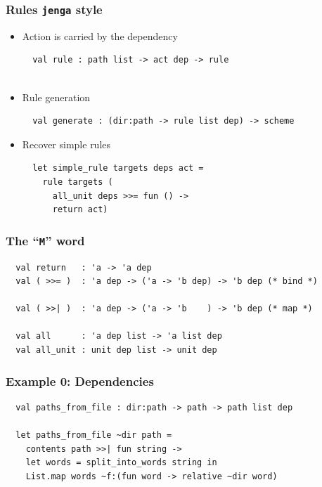\documentclass{beamer}
\begin{document}


\begin{frame}[fragile]
\frametitle{Rules {\tt jenga} style}
\begin{itemize}
\item Action is carried by the dependency
{\footnotesize
\begin{verbatim}
  val rule : path list -> act dep -> rule
  
\end{verbatim}}
\item Rule generation
{\footnotesize
\begin{verbatim}
  val generate : (dir:path -> rule list dep) -> scheme

\end{verbatim}}
\item Recover simple rules
{\footnotesize
\begin{verbatim}
  let simple_rule targets deps act =
    rule targets (
      all_unit deps >>= fun () ->
      return act)
\end{verbatim}}
\end{itemize}
\end{frame}



\begin{frame}[fragile]
\frametitle{The ``{\tt M}'' word}
{\footnotesize
\begin{verbatim}
  val return   : 'a -> 'a dep
  val ( >>= )  : 'a dep -> ('a -> 'b dep) -> 'b dep (* bind *)

  val ( >>| )  : 'a dep -> ('a -> 'b    ) -> 'b dep (* map *)

  val all      : 'a dep list -> 'a list dep
  val all_unit : unit dep list -> unit dep

\end{verbatim}}
\end{frame}

%
%


\begin{frame}[fragile]
\frametitle{Example 0: Dependencies}
{\footnotesize
\begin{verbatim}
  val paths_from_file : dir:path -> path -> path list dep

  let paths_from_file ~dir path =
    contents path >>| fun string ->
    let words = split_into_words string in
    List.map words ~f:(fun word -> relative ~dir word)
\end{verbatim}}
\begin{verbatim}
\end{verbatim}
\end{frame}
\end{document}
